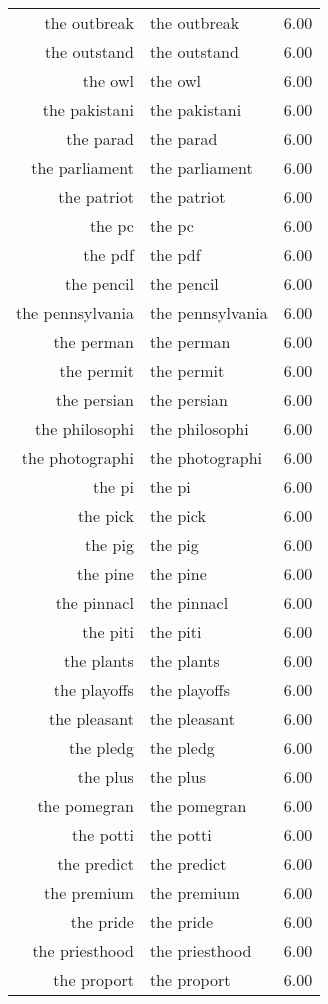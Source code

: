 \begin{table}[ht]
\begin{tabular}{rlr}
  the outbreak & the outbreak & 6.00 \\ 
  the outstand & the outstand & 6.00 \\ 
  the owl & the owl & 6.00 \\ 
  the pakistani & the pakistani & 6.00 \\ 
  the parad & the parad & 6.00 \\ 
  the parliament & the parliament & 6.00 \\ 
  the patriot & the patriot & 6.00 \\ 
  the pc & the pc & 6.00 \\ 
  the pdf & the pdf & 6.00 \\ 
  the pencil & the pencil & 6.00 \\ 
  the pennsylvania & the pennsylvania & 6.00 \\ 
  the perman & the perman & 6.00 \\ 
  the permit & the permit & 6.00 \\ 
  the persian & the persian & 6.00 \\ 
  the philosophi & the philosophi & 6.00 \\ 
  the photographi & the photographi & 6.00 \\ 
  the pi & the pi & 6.00 \\ 
  the pick & the pick & 6.00 \\ 
  the pig & the pig & 6.00 \\ 
  the pine & the pine & 6.00 \\ 
  the pinnacl & the pinnacl & 6.00 \\ 
  the piti & the piti & 6.00 \\ 
  the plants & the plants & 6.00 \\ 
  the playoffs & the playoffs & 6.00 \\ 
  the pleasant & the pleasant & 6.00 \\ 
  the pledg & the pledg & 6.00 \\ 
  the plus & the plus & 6.00 \\ 
  the pomegran & the pomegran & 6.00 \\ 
  the potti & the potti & 6.00 \\ 
  the predict & the predict & 6.00 \\ 
  the premium & the premium & 6.00 \\ 
  the pride & the pride & 6.00 \\ 
  the priesthood & the priesthood & 6.00 \\ 
  the proport & the proport & 6.00 \\ 

\end{tabular}
\end{table}
